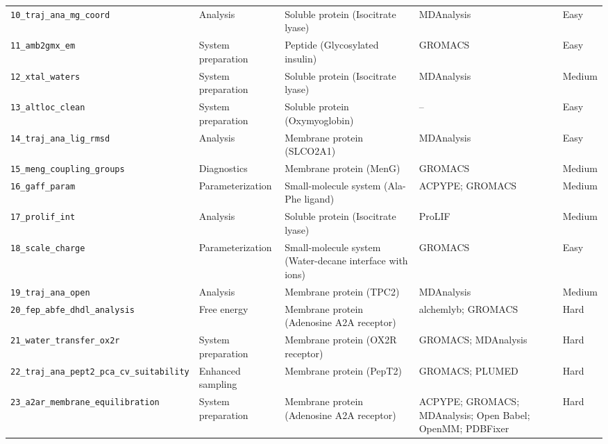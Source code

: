 \documentclass[11pt,a4paper]{article}
\begin{document}
\begin{longtable}{@{}L{0.19\textwidth}L{0.15\textwidth}L{0.29\textwidth}L{0.24\textwidth}L{0.09\textwidth}@{}}
\texttt{10\_\allowbreak{}traj\_\allowbreak{}ana\_\allowbreak{}mg\_\allowbreak{}coord} & Analysis & Soluble protein (Isocitrate lyase) & MDAnalysis & Easy \\
\texttt{11\_\allowbreak{}amb2gmx\_\allowbreak{}em} & System preparation & Peptide (Glycosylated insulin) & GROMACS & Easy \\
\texttt{12\_\allowbreak{}xtal\_\allowbreak{}waters} & System preparation & Soluble protein (Isocitrate lyase) & MDAnalysis & Medium \\
\texttt{13\_\allowbreak{}altloc\_\allowbreak{}clean} & System preparation & Soluble protein (Oxymyoglobin) & -- & Easy \\
\texttt{14\_\allowbreak{}traj\_\allowbreak{}ana\_\allowbreak{}lig\_\allowbreak{}rmsd} & Analysis & Membrane protein (SLCO2A1) & MDAnalysis & Easy \\
\texttt{15\_\allowbreak{}meng\_\allowbreak{}coupling\_\allowbreak{}groups} & Diagnostics & Membrane protein (MenG) & GROMACS & Medium \\
\texttt{16\_\allowbreak{}gaff\_\allowbreak{}param} & Parameterization & Small-molecule system (Ala-Phe ligand) & ACPYPE; \allowbreak{}GROMACS & Medium \\
\texttt{17\_\allowbreak{}prolif\_\allowbreak{}int} & Analysis & Soluble protein (Isocitrate lyase) & ProLIF & Medium \\
\texttt{18\_\allowbreak{}scale\_\allowbreak{}charge} & Parameterization & Small-molecule system (Water-decane interface with ions) & GROMACS & Easy \\
\texttt{19\_\allowbreak{}traj\_\allowbreak{}ana\_\allowbreak{}open} & Analysis & Membrane protein (TPC2) & MDAnalysis & Medium \\
\texttt{20\_\allowbreak{}fep\_\allowbreak{}abfe\_\allowbreak{}dhdl\_\allowbreak{}analysis} & Free energy & Membrane protein (Adenosine A2A receptor) & alchemlyb; \allowbreak{}GROMACS & Hard \\
\texttt{21\_\allowbreak{}water\_\allowbreak{}transfer\_\allowbreak{}ox2r} & System preparation & Membrane protein (OX2R receptor) & GROMACS; \allowbreak{}MDAnalysis & Hard \\
\texttt{22\_\allowbreak{}traj\_\allowbreak{}ana\_\allowbreak{}pept2\_\allowbreak{}pca\_\allowbreak{}cv\_\allowbreak{}suitability} & Enhanced sampling & Membrane protein (PepT2) & GROMACS; \allowbreak{}PLUMED & Hard \\
\texttt{23\_\allowbreak{}a2ar\_\allowbreak{}membrane\_\allowbreak{}equilibration} & System preparation & Membrane protein (Adenosine A2A receptor) & ACPYPE; \allowbreak{}GROMACS; \allowbreak{}MDAnalysis; \allowbreak{}Open Babel; \allowbreak{}OpenMM; \allowbreak{}PDBFixer & Hard \\

\end{longtable}
\end{document}
